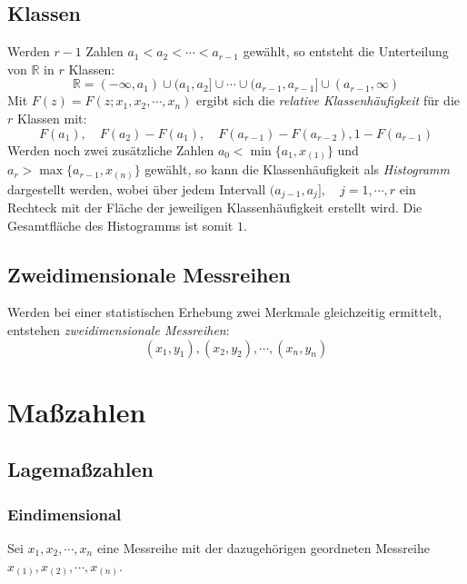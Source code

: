 \documentclass[a4paper, 11pt, accentcolor = tud3b]{tudreport}
\newcommand{\R}{\ensuremath{\mathbb{R}}}
\begin{document}
            \subsection{Klassen}
                Werden \( r - 1 \) Zahlen \( a_1 < a_2 < \cdots < a_{r-1} \) gewählt, so entsteht die Unterteilung von \(\R\) in \(r\) Klassen:
	            \begin{equation*}
		            \R = (-\infty, a_1) \cup (a_1, a_2] \cup \cdots \cup (a_{r-1}, a_{r-1}] \cup (a_{r-1}, \infty)
	            \end{equation*}
	            Mit \( F(z) = F(z; x_1, x_2, \cdots, x_n) \) ergibt sich die \textit{relative Klassenhäufigkeit} für die \(r\) Klassen mit:
	            \begin{equation*}
		            F(a_1), \quad F(a_2) - F(a_1), \quad F(a_{r-1}) - F(a_{r-2}), 1 - F(a_{r-1})
	            \end{equation*}
	            Werden noch zwei zusätzliche Zahlen \( a_0 < \min \{ a_1, x_{(1)} \} \) und \( a_r > \max \{ a_{r-1}, x_{(n)} \} \) gewählt, so kann die Klassenhäufigkeit als \textit{Histogramm} dargestellt werden, wobei über jedem Intervall \( (a_{j-1}, a_j], \quad j = 1, \cdots, r \) ein Rechteck mit der Fläche der jeweiligen Klassenhäufigkeit erstellt wird. Die Gesamtfläche des Histogramms ist somit \(1\).

            \subsection{Zweidimensionale Messreihen}
                Werden bei einer statistischen Erhebung zwei Merkmale gleichzeitig ermittelt, entstehen \textit{zweidimensionale Messreihen}:
                \begin{equation*}
	                (x_1, y_1), (x_2, y_2), \cdots, (x_n, y_n)
                \end{equation*}

        \section{Maßzahlen}
            \subsection{Lagemaßzahlen}
                \subsubsection{Eindimensional}
	                Sei \( x_1, x_2, \cdots, x_n \) eine Messreihe mit der dazugehörigen geordneten Messreihe \( x_{(1)}, x_{(2)}, \cdots, x_{(n)} \).
                
\end{document}
